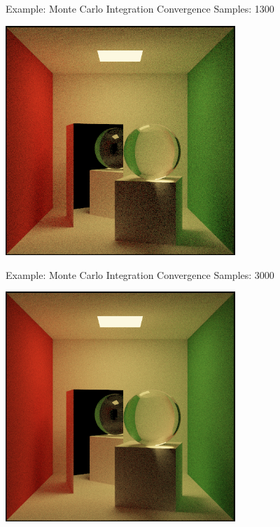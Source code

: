 \documentclass{beamer}
\begin{document}
\begin{frame}{Example: Monte Carlo Integration Convergence}
    Samples: 1300
    \begin{center}
        \includegraphics[width=0.65\textwidth]{../img/convergence/cornell-01300.png}
    \end{center}
\end{frame}

\begin{frame}{Example: Monte Carlo Integration Convergence}
    Samples: 3000
    \begin{center}
        \includegraphics[width=0.65\textwidth]{../img/convergence/cornell-03000.png}
    \end{center}
\end{frame}
\end{document}
